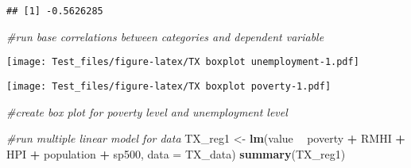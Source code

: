 \documentclass[
]{article}
\newenvironment{Shaded}{\begin{snugshade}}{\end{snugshade}}
\newcommand{\CommentTok}[1]{\textcolor[rgb]{0.56,0.35,0.01}{\textit{#1}}}
\newcommand{\DataTypeTok}[1]{\textcolor[rgb]{0.13,0.29,0.53}{#1}}
\newcommand{\DecValTok}[1]{\textcolor[rgb]{0.00,0.00,0.81}{#1}}
\newcommand{\KeywordTok}[1]{\textcolor[rgb]{0.13,0.29,0.53}{\textbf{#1}}}
\newcommand{\NormalTok}[1]{#1}
\newcommand{\OperatorTok}[1]{\textcolor[rgb]{0.81,0.36,0.00}{\textbf{#1}}}
\newcommand{\StringTok}[1]{\textcolor[rgb]{0.31,0.60,0.02}{#1}}
\begin{document}
\begin{verbatim}
## [1] -0.5626285
\end{verbatim}

\begin{Shaded}
\begin{Highlighting}[]
\CommentTok{#run base correlations between categories and dependent variable}
\end{Highlighting}
\end{Shaded}

\begin{Shaded}
\end{Shaded}

\texttt{[image: Test\_files/figure-latex/TX boxplot unemployment-1.pdf]}

\begin{Shaded}
\end{Shaded}

\texttt{[image: Test\_files/figure-latex/TX boxplot poverty-1.pdf]}

\begin{Shaded}
\begin{Highlighting}[]
\CommentTok{#create box plot for poverty level and unemployment level}
\end{Highlighting}
\end{Shaded}

\begin{Shaded}
\begin{Highlighting}[]
\CommentTok{#run multiple linear model for data}
\NormalTok{TX_reg1 <-}\StringTok{ }\KeywordTok{lm}\NormalTok{(value }\OperatorTok{~}\StringTok{ }\NormalTok{poverty }\OperatorTok{+}\StringTok{ }\NormalTok{RMHI }\OperatorTok{+}\StringTok{ }\NormalTok{HPI }\OperatorTok{+}\StringTok{ }\NormalTok{population }\OperatorTok{+}\StringTok{ }\NormalTok{sp500, }\DataTypeTok{data =}\NormalTok{ TX_data)}
\KeywordTok{summary}\NormalTok{(TX_reg1)}
\end{Highlighting}
\end{Shaded}
\end{document}
